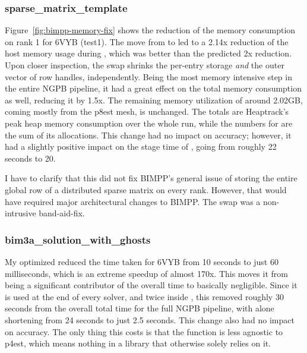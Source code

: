 \subsubsection{sparse\_matrix\_template}

Figure~\ref{fig:bimpp-memory-fix} shows the reduction of the memory consumption on rank 1 for 6VYB (test1).
The move from  to  led to a 2.14x reduction of the host memory usage during , which was better than the predicted 2x reduction.
Upon closer inspection, the swap shrinks the per-entry storage \textit{and} the outer vector of row handles, independently.
Being the most memory intensive step in the entire NGPB pipeline, it had a great effect on the total memory consumption as well, reducing it by 1.5x.
The remaining memory utilization of around 2.02GB, coming mostly from the p8est mesh, is unchanged.
The totals are Heaptrack's peak heap memory consumption over the whole run, while the numbers for  are the sum of its allocations.
This change had no impact on accuracy; however, it had a slightly positive impact on the stage time of , going from roughly 22 seconds to 20.

I have to clarify that this did not fix BIMPP's general issue of storing the entire global row of a distributed sparse matrix on every rank.
However, that would have required major architectural changes to BIMPP.
The swap was a non-intrusive band-aid-fix.



\subsubsection{bim3a\_solution\_with\_ghosts}

My optimized  reduced the time taken for 6VYB from 10 seconds to just 60 milliseconds, which is an extreme speedup of almost 170x.
This moves it from being a significant contributor of the overall time to basically negligible.
Since it is used at the end of every solver, and twice inside , this removed roughly 30 seconds from the overall total time for the full NGPB pipeline, with  alone shortening from 24 seconds to just 2.5 seconds.
This change also had no impact on accuracy.
The only thing this costs is that the function is less agnostic to p4est, which means nothing in a library that otherwise solely relies on it.

